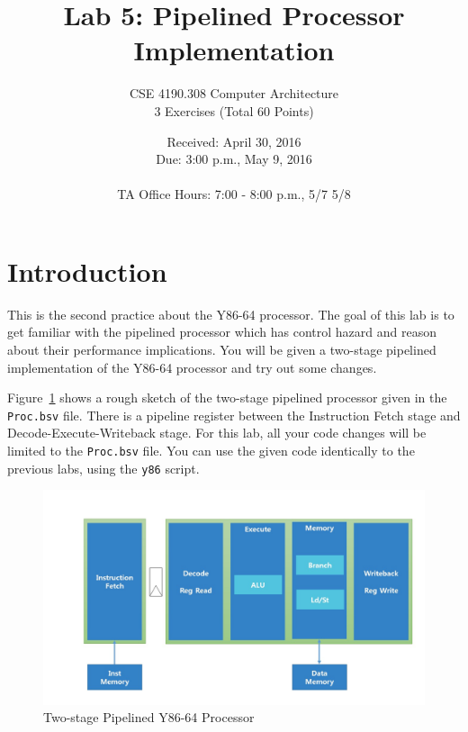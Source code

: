 \documentclass{article}
\begin{document}
\title{Lab 5: Pipelined Processor Implementation}   %
\author{CSE 4190.308 Computer Architecture \\ 3 Exercises (Total 60 Points) }
\date{Received: April 30, 2016 \\Due: 3:00 p.m., May 9, 2016\\ \ \\ TA Office Hours: 7:00 - 8:00 p.m., 5/7 5/8}    %
\maketitle

\section{Introduction}

This is the second practice about the Y86-64 processor.
The goal of this lab is to get familiar with the pipelined processor which
has control hazard and reason about their performance implications.
You will be given a two-stage pipelined implementation of the Y86-64
processor and try out some changes.

Figure~\ref{fig:2pipe_proc} shows a rough sketch of the two-stage pipelined processor given in the \texttt{Proc.bsv} file.
There is a pipeline register between the Instruction Fetch stage and Decode-Execute-Writeback stage.
For this lab, all your code changes will be limited to the \texttt{Proc.bsv} file.
You can use the given code identically to the previous labs, using the \texttt{y86} script.

\begin{figure}[htbp]
	\begin{center}
		\includegraphics[scale=0.3]{twoStage.jpg}
		\caption{Two-stage Pipelined Y86-64 Processor}
		\label{fig:2pipe_proc}
	\end{center}
\end{figure}
\end{document}
